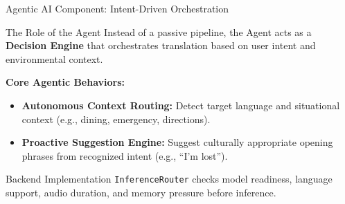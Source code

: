 \documentclass{beamer}
\begin{document}
\begin{frame}[t]{Agentic AI Component: Intent-Driven Orchestration}
\small

\begin{block}{The Role of the Agent}
Instead of a passive pipeline, the Agent acts as a \textbf{Decision Engine}
that orchestrates translation based on user intent and environmental context.
\end{block}

\vspace{2pt}
\textbf{Core Agentic Behaviors:}
\begin{itemize}\setlength{\itemsep}{4pt}
    \item \textbf{Autonomous Context Routing:}
    Detect target language and situational context
    (e.g., dining, emergency, directions).

    \item \textbf{Proactive Suggestion Engine:}
    Suggest culturally appropriate opening phrases
    from recognized intent (e.g., ``I'm lost'').
\end{itemize}

\vspace{2pt}
\begin{block}{Backend Implementation}
\texttt{InferenceRouter} checks model readiness, language support,
audio duration, and memory pressure before inference.
\end{block}

\end{frame}
\end{document}
